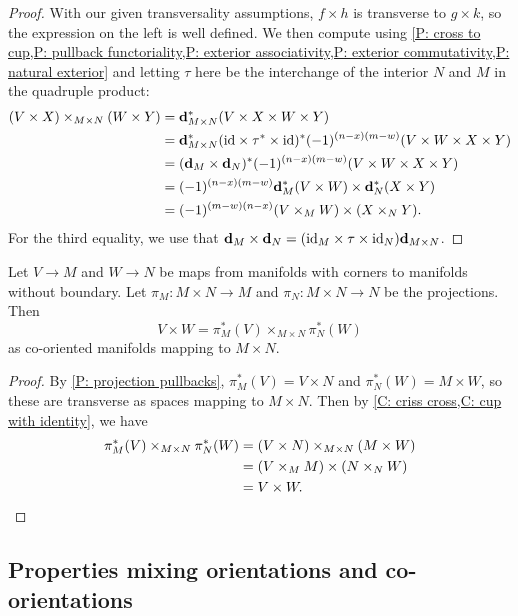 \begin{proof}
	With our given transversality assumptions, $f \times h$ is transverse to $g \times k$, so the expression on the left is well defined.
	We then compute using \cref{P: cross to cup,P: pullback functoriality,P: exterior associativity,P: exterior commutativity,P: natural exterior} and letting $\tau$ here be the interchange of the interior $N$ and $M$ in the quadruple product:
	\begin{align*}
		(V \times X)\times_{M \times N} (W \times Y)& = \mathbf{d}_{M \times N}^*(V \times X \times W \times Y)\\
		& = \mathbf{d}_{M \times N}^*(\mathrm{id} \times \tau^* \times \mathrm{id})^*(-1)^{(n-x)(m-w)}(V \times W \times X \times Y)\\
		& = (\mathbf{d}_M \times \mathbf{d}_N)^*(-1)^{(n-x)(m-w)}(V \times W \times X \times Y)\\
		& = (-1)^{(n-x)(m-w)}\mathbf{d}_M^*(V \times W) \times \mathbf{d}_N^*( X \times Y)\\
		& = (-1)^{(m-w)(n-x)} (V \times_M W) \times (X \times_N Y).
	\end{align*}
	For the third equality, we use that $\mathbf{d}_M \times \mathbf{d}_N = (\mathrm{id}_M \times \tau \times \mathrm{id}_N)\mathbf{d}_{M \times N}$.
\end{proof}

\begin{corollary}\label{C: cross is cup}
	Let $V \to M$ and $W \to N$ be maps from manifolds with corners to manifolds without boundary.
	Let $\pi_M \colon M \times N \to M$ and $\pi_N \colon M \times N \to N$ be the projections.
	Then $$V \times W = \pi_M^*(V)\times_{M \times N}\pi_N^*(W)$$ as co-oriented manifolds mapping to $M \times N$.
\end{corollary}

\begin{proof}
	By \cref{P: projection pullbacks}, $\pi_M^*(V) = V \times N$ and $\pi_N^*(W) = M \times W$, so these are transverse as spaces mapping to $M \times N$.
	Then by \cref{C: criss cross,C: cup with identity}, we have
	\begin{align*}
		\pi_M^*(V)\times_{M \times N}\pi_N^*(W)& = (V \times N)\times_{M \times N} (M \times W)\\
		& = (V \times_M M) \times (N \times_N W)\\
		& = V \times W.\qedhere
	\end{align*}
\end{proof}

\subsection{Properties mixing orientations and co-orientations}


